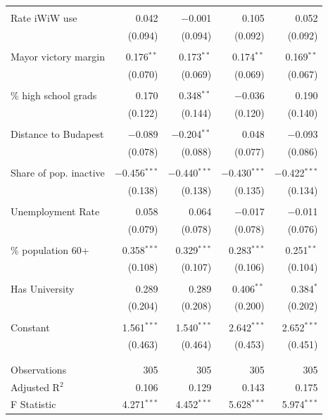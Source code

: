 \begin{table}
\begin{center}
\begin{tabular}{@{\extracolsep{.3cm}}lr{1cm}r{1cm}r{1cm}r{1cm}}
  & & & & \\ 
 Rate iWiW use & 0.042 & $-$0.001 & 0.105 & 0.052 \\ 
  & (0.094) & (0.094) & (0.092) & (0.092) \\ 
  & & & & \\ 
 Mayor victory margin & 0.176$^{**}$ & 0.173$^{**}$ & 0.174$^{**}$ & 0.169$^{**}$ \\ 
  & (0.070) & (0.069) & (0.069) & (0.067) \\ 
  & & & & \\ 
 \% high school grads & 0.170 & 0.348$^{**}$ & $-$0.036 & 0.190 \\ 
  & (0.122) & (0.144) & (0.120) & (0.140) \\ 
  & & & & \\ 
 Distance to Budapest & $-$0.089 & $-$0.204$^{**}$ & 0.048 & $-$0.093 \\ 
  & (0.078) & (0.088) & (0.077) & (0.086) \\ 
  & & & & \\ 
 Share of pop. inactive & $-$0.456$^{***}$ & $-$0.440$^{***}$ & $-$0.430$^{***}$ & $-$0.422$^{***}$ \\ 
  & (0.138) & (0.138) & (0.135) & (0.134) \\ 
  & & & & \\ 
 Unemployment Rate & 0.058 & 0.064 & $-$0.017 & $-$0.011 \\ 
  & (0.079) & (0.078) & (0.078) & (0.076) \\ 
  & & & & \\ 
 \% population 60+ & 0.358$^{***}$ & 0.329$^{***}$ & 0.283$^{***}$ & 0.251$^{**}$ \\ 
  & (0.108) & (0.107) & (0.106) & (0.104) \\ 
  & & & & \\ 
 Has University & 0.289 & 0.289 & 0.406$^{**}$ & 0.384$^{*}$ \\ 
  & (0.204) & (0.208) & (0.200) & (0.202) \\ 
  & & & & \\ 
 Constant & 1.561$^{***}$ & 1.540$^{***}$ & 2.642$^{***}$ & 2.652$^{***}$ \\ 
  & (0.463) & (0.464) & (0.453) & (0.451) \\ 
  & & & & \\ 
\hline \\[-1.8ex] 
Observations & 305 & 305 & 305 & 305 \\ 
Adjusted R$^{2}$ & 0.106 & 0.129 & 0.143 & 0.175 \\ 
F Statistic & 4.271$^{***}$ & 4.452$^{***}$ & 5.628$^{***}$  & 5.974$^{***}$  \\ 

\end{tabular}
\end{center}
\end{table}
